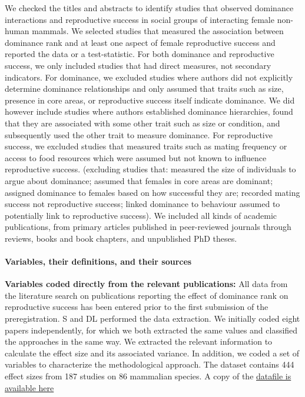 \documentclass[]{article}
\let\oldparagraph\paragraph
\renewcommand{\paragraph}[1]{\oldparagraph{#1}\mbox{}}
\begin{document}
We checked the titles and abstracts to identify studies that observed
dominance interactions and reproductive success in social groups of
interacting female non-human mammals. We selected studies that measured
the association between dominance rank and at least one aspect of female
reproductive success and reported the data or a test-statistic. For both
dominance and reproductive success, we only included studies that had
direct measures, not secondary indicators. For dominance, we excluded
studies where authors did not explicitly determine dominance
relationships and only assumed that traits such as size, presence in
core areas, or reproductive success itself indicate dominance. We did
however include studies where authors established dominance hierarchies,
found that they are associated with some other trait such as size or
condition, and subsequently used the other trait to measure dominance.
For reproductive success, we excluded studies that measured traits such
as mating frequency or access to food resources which were assumed but
not known to influence reproductive success. (excluding studies that:
measured the size of individuals to argue about dominance; assumed that
females in core areas are dominant; assigned dominance to females based
on how successful they are; recorded mating success not reproductive
success; linked dominance to behaviour assumed to potentially link to
reproductive success). We included all kinds of academic publications,
from primary articles published in peer-reviewed journals through
reviews, books and book chapters, and unpublished PhD theses.

\hypertarget{variables-their-definitions-and-their-sources}{%
\paragraph{\texorpdfstring{\textbf{Variables, their definitions, and
their
sources}}{Variables, their definitions, and their sources}}\label{variables-their-definitions-and-their-sources}}

\textbf{Variables coded directly from the relevant publications:} All
data from the literature search on publications reporting the effect of
dominance rank on reproductive success has been entered prior to the
first submission of the preregistration. S and DL performed the data
extraction. We initially coded eight papers independently, for which we
both extracted the same values and classified the approaches in the same
way. We extracted the relevant information to calculate the effect size
and its associated variance. In addition, we coded a set of variables to
characterize the methodological approach. The dataset contains 444
effect sizes from 187 studies on 86 mammalian species. A copy of the
\href{https://github.com/dieterlukas/FemaleDominanceReproduction_MetaAnalysis}{datafile
is available here}
\end{document}
